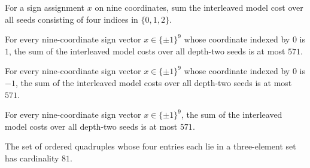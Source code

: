 \begin{definition}
\label{FABL.depthTwoInterleavedModelCostSum}
\leanok
{}
For a sign assignment $x$ on nine coordinates, sum the interleaved model cost over all
seeds consisting of four indices in $\{0,1,2\}$.
\end{definition}

\begin{theorem}
\label{FABL.depthTwoInterleavedModelCostSum_le_of_first_eq_one}
\leanok
{}
For every nine-coordinate sign vector $x\in\{\pm1\}^9$ whose coordinate indexed by $0$
is $1$, the sum of the interleaved model costs over all depth-two seeds is at most
$571$.
\end{theorem}

\begin{theorem}
\label{FABL.depthTwoInterleavedModelCostSum_le_of_first_eq_neg_one}
\leanok
{}
For every nine-coordinate sign vector $x\in\{\pm1\}^9$ whose coordinate indexed by $0$
is $-1$, the sum of the interleaved model costs over all depth-two seeds is at most
$571$.
\end{theorem}

\begin{theorem}
\label{FABL.depthTwoInterleavedModelCostSum_le}
\leanok
{}
For every nine-coordinate sign vector $x\in\{\pm1\}^9$, the sum of the interleaved model
costs over all depth-two seeds is at most $571$.
\end{theorem}

\begin{theorem}
\label{FABL.card_depthTwoInterleavedSeed}
\leanok
{}
The set of ordered quadruples whose four entries each lie in a three-element set has
cardinality $81$.
\end{theorem}

